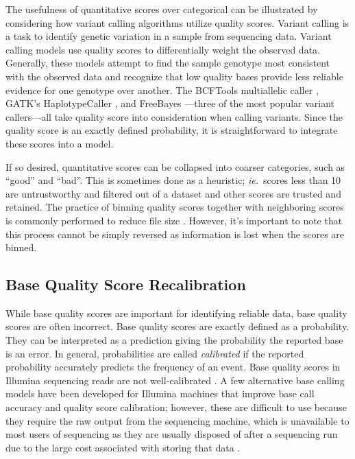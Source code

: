 The usefulness of quantitative scores over categorical can be illustrated by considering how variant calling algorithms utilize quality scores.
Variant calling is a task to identify genetic variation in a sample from sequencing data.
Variant calling models use quality scores to differentially weight the observed data. Generally, these models attempt to find the sample genotype most consistent with the observed data and recognize that low quality bases provide less reliable evidence for one genotype over another. The BCFTools multiallelic caller \parencite{li_sequence_2009}, GATK's HaplotypeCaller \parencite{poplin_scaling_2018}, and FreeBayes \parencite{garrison_haplotype-based_2012}---three of the most popular variant callers---all take quality score into consideration when calling variants.
Since the quality score is an exactly defined probability, it is straightforward to integrate these scores into a model.

If so desired, quantitative scores can be collapsed into coarser categories, such as ``good'' and ``bad''. This is sometimes done as a heuristic; \textit{ie.}\ scores less than 10 are untrustworthy and filtered out of a dataset and other scores are trusted and retained.
The practice of binning quality scores together with neighboring scores is commonly performed to reduce file size \parencite{shibuya_better_2019, malysa_qvz_2015, yu_quality_2015, noauthor_reducing_2014}. 
However, it's important to note that this process cannot be simply reversed as information is lost when the scores are binned.

\subsection{Base Quality Score Recalibration}

While base quality scores are important for identifying reliable data, base quality scores are often incorrect.
Base quality scores are exactly defined as a probability. They can be interpreted as a prediction giving the probability the reported base is an error. In general, probabilities are called \textit{calibrated} if the reported probability accurately predicts the frequency of an event.
Base quality scores in Illumina sequencing reads are not well-calibrated \parencite{callahan_dada2:_2016, ni_improvement_2016}. %
A few alternative base calling models have been developed for Illumina machines that improve base call accuracy and quality score calibration; however, these are difficult to use because they require the raw output from the sequencing machine, which is unavailable to most users of sequencing as they are usually disposed of after a sequencing run due to the large cost associated with storing that data \parencite{kao_naivebayescall_2011, massingham_all_2012}. 


